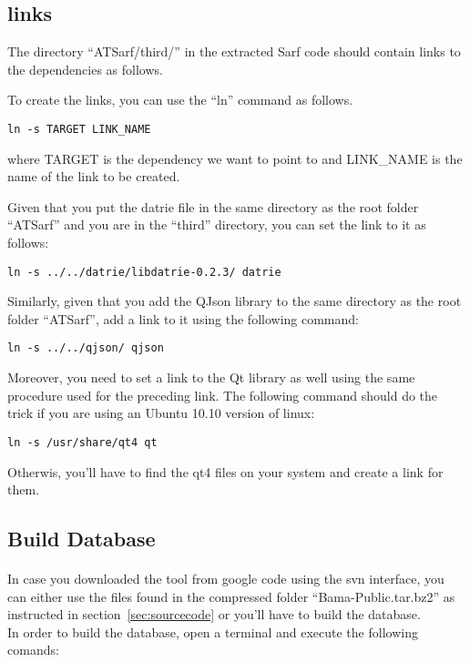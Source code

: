 \documentclass{article}
\begin{document}
\subsection{links}
The directory ``ATSarf/third/'' in the extracted Sarf code should contain links to the dependencies as follows.

To create the links, you can use the ``ln'' command as follows.\\
\begin{verbatim}
ln -s TARGET LINK_NAME
\end{verbatim}
where TARGET is the dependency we want to point to and LINK\_NAME is the name of the link to be created.

Given that you put the datrie file in the same directory as the root folder ``ATSarf'' and you are in the ``third'' directory, you can set the link to it as follows:
\begin{verbatim}
ln -s ../../datrie/libdatrie-0.2.3/ datrie
\end{verbatim}

Similarly, given that you add the QJson library to the same directory as the root folder ``ATSarf'', add a link to it using the following command:
\begin{verbatim}
ln -s ../../qjson/ qjson
\end{verbatim}

Moreover, you need to set a link to the Qt library as well using the same procedure used for the preceding link. 
The following command should do the trick if you are using an Ubuntu 10.10 version of linux:
\begin{verbatim}
ln -s /usr/share/qt4 qt
\end{verbatim}
Otherwis, you'll have to find the qt4 files on your system and create a link for them.

\subsection{Build Database}

\paragraph{}
In case you downloaded the tool from google code using the svn interface, you can either use the files found in the compressed folder ``Bama-Public.tar.bz2'' as instructed in section~\ref{sec:sourcecode} or you'll have to build the database.\\
In order to build the database, open a terminal and execute the following comands:
\end{document}
